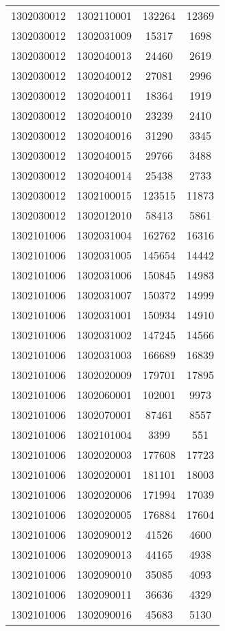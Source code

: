 \begin{longtable}[h]{llcc}
		1302030012 & 1302110001 & 132264 & 12369\\
		1302030012 & 1302031009 & 15317 & 1698\\
		1302030012 & 1302040013 & 24460 & 2619\\
		1302030012 & 1302040012 & 27081 & 2996\\
		1302030012 & 1302040011 & 18364 & 1919\\
		1302030012 & 1302040010 & 23239 & 2410\\
		1302030012 & 1302040016 & 31290 & 3345\\
		1302030012 & 1302040015 & 29766 & 3488\\
		1302030012 & 1302040014 & 25438 & 2733\\
		1302030012 & 1302100015 & 123515 & 11873\\
		1302030012 & 1302012010 & 58413 & 5861\\
		1302101006 & 1302031004 & 162762 & 16316\\
		1302101006 & 1302031005 & 145654 & 14442\\
		1302101006 & 1302031006 & 150845 & 14983\\
		1302101006 & 1302031007 & 150372 & 14999\\
		1302101006 & 1302031001 & 150934 & 14910\\
		1302101006 & 1302031002 & 147245 & 14566\\
		1302101006 & 1302031003 & 166689 & 16839\\
		1302101006 & 1302020009 & 179701 & 17895\\
		1302101006 & 1302060001 & 102001 & 9973\\
		1302101006 & 1302070001 & 87461 & 8557\\
		1302101006 & 1302101004 & 3399 & 551\\
		1302101006 & 1302020003 & 177608 & 17723\\
		1302101006 & 1302020001 & 181101 & 18003\\
		1302101006 & 1302020006 & 171994 & 17039\\
		1302101006 & 1302020005 & 176884 & 17604\\
		1302101006 & 1302090012 & 41526 & 4600\\
		1302101006 & 1302090013 & 44165 & 4938\\
		1302101006 & 1302090010 & 35085 & 4093\\
		1302101006 & 1302090011 & 36636 & 4329\\
		1302101006 & 1302090016 & 45683 & 5130\\

\end{longtable}
